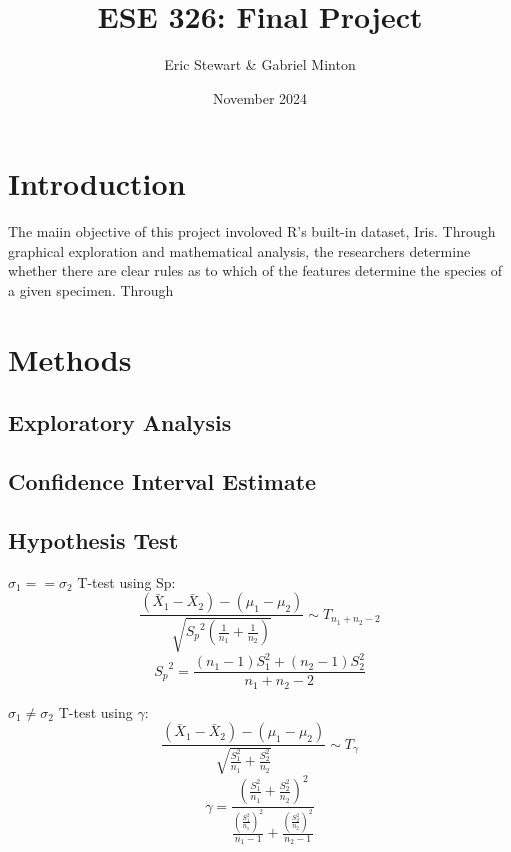 \documentclass{article}
\title{ESE 326: Final Project}
\author{Eric Stewart \& Gabriel Minton}
\date{November 2024}
\begin{document}
\maketitle

\section{Introduction}
The maiin objective of this project involoved R's built-in dataset, Iris. Through graphical exploration and
mathematical analysis, the researchers determine
whether there are clear rules as to which of the features determine the species of a given specimen. Through 



\color{Aquamarine}


\section{Methods}

\subsection{Exploratory Analysis}


\subsection{Confidence Interval Estimate}



\subsection{Hypothesis Test}

$\sigma_1 == \sigma_2$ T-test using Sp:
\begin{equation}
	\frac{(\bar{X}_1 - \bar{X}_2) - (\mu_1 - \mu_2)}{\sqrt{{S_p}^2 \left(\frac{1}{n_1} + \frac{1}{n_2} \right)}} \sim T_{n_1 + n_2 -2}
	\label{eq:t-test_equal}
\end{equation}
\begin{equation}
	{S_p}^2 = \frac{(n_1 - 1) S_1^2 + (n_2 -1) S_2^2}{n_1 + n_2 -2}
	\label{eq:pool_sample_variance}
\end{equation}

$\sigma_1 \neq \sigma_2$ T-test using $\gamma$:
\begin{equation}
	\frac{(\bar{X}_1 - \bar{X}_2) - (\mu_1 - \mu_2)}{\sqrt{\frac{S_1^2}{n_1} + \frac{S_2^2}{n_2}}} \sim T_\gamma
	\label{eq:t-test_unequal}
\end{equation}
\begin{equation}
	\gamma = \frac{\left(\frac{S_1^2}{n_1} + \frac{S_2^2}{n_2} \right)^2}{\frac{\left(\frac{S_1^2}{n_1} \right)^2}{n_1 - 1} + \frac{\left(\frac{S_2^2}{n_2} \right)^2}{n_2 - 1}}
	\label{eq:gamma_unequal}
\end{equation}
\end{document}
